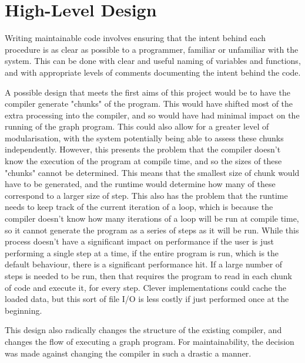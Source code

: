 \documentclass{UoYCSproject}
\begin{document}
\section{High-Level Design}
Writing maintainable code involves ensuring that the intent behind each procedure is as clear as possible to a programmer, familiar or unfamiliar with the system. This can be done with clear and useful naming of variables and functions, and with appropriate levels of comments documenting the intent behind the code.

A possible design that meets the first aims of this project would be to have the compiler generate "chunks" of the program. This would have shifted most of the extra processing into the compiler, and so would have had minimal impact on the running of the graph program. This could also allow for a greater level of modularisation, with the system potentially being able to assess these chunks independently.
However, this presents the problem that the compiler doesn't know the execution of the program at compile time, and so the sizes of these "chunks" cannot be determined. This means that the smallest size of chunk would have to be generated, and the runtime would determine how many of these correspond to a larger size of step. This also has the problem that the runtime needs to keep track of the current iteration of a loop, which is because the compiler doesn't know how many iterations of a loop will be run at compile time, so it cannot generate the program as a series of steps as it will be run. While this process doesn't have a significant impact on performance if the user is just performing a single step at a time, if the entire program is run, which is the default behaviour, there is a significant performance hit. If a large number of steps is needed to be run, then that requires the program to read in each chunk of code and execute it, for every step. Clever implementations could cache the loaded data, but this sort of file I/O is less costly if just performed once at the beginning.

This design also radically changes the structure of the existing compiler, and changes the flow of executing a graph program. For maintainability, the decision was made against changing the compiler in such a drastic a manner.
\end{document}
